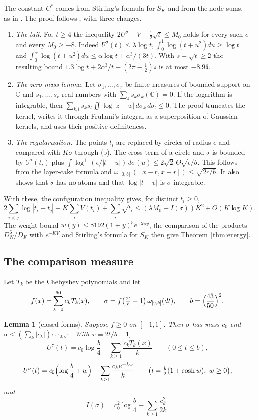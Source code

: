 \documentclass[11pt]{amsart}
\newtheorem{lemma}[theorem]{Lemma}
\theoremstyle{definition}
\theoremstyle{remark}
\numberwithin{equation}{section}
\newcommand{\C}{\mathbb C}
\begin{document}
The constant $C^*$ comes from Stirling's formula for $S_K$ and from the node sums, as in \cite[(6.3)]{Fauzan2026}. The
proof follows \cite[\S6]{Fauzan2026}, with three changes.
\begin{enumerate}[label=(\alph*),leftmargin=*]
\item \emph{The tail.} For $t\ge4$ the inequality $2U^\sigma-V+\frac12\sqrt t\le M_0$ holds for every such
 $\sigma$ and every $M_0\ge-8$. Indeed $U^\sigma(t)\le\lambda\log t$, $\int_0^1\log(t+u^2)du\ge\log t$ and
 $\int_0^\alpha\log(t+u^2)du\le\alpha\log t+\alpha^3/(3t)$. With $s=\sqrt t\ge2$ the resulting bound
 $1.3\log t+2\alpha^3/t-(2\pi-\frac12)s$ is at most $-8.96$.
\item \emph{The zero-mass lemma.} Let $\sigma_1,\dots,\sigma_r$ be finite measures of bounded support on $\C$ and
 $s_1,\dots,s_r$ real numbers with $\sum_ks_k\sigma_k(\C)=0$. If the logarithm is integrable, then
 $\sum_{k,l}s_ks_l\iint\log|z-w|\,d\sigma_k\,d\sigma_l\le0$. The proof truncates the kernel, writes it through
 Frullani's integral as a superposition of Gaussian kernels, and uses their positive definiteness.
\item \emph{The regularization.} The points $t_i$ are replaced by circles of radius $\epsilon$ and compared with
 $K\sigma$ through (b). The cross term of a circle and $\sigma$ is bounded by $U^\sigma(t_i)$ plus
 $\int\log^+(\epsilon/|t-u|)\,d\sigma(u)\le2\sqrt2\,\Theta\sqrt{\epsilon/b}$. This follows from the layer-cake formula
 and $\omega_{[0,b]}([x-r,x+r])\le\sqrt{2r/b}$. It also shows that $\sigma$ has no atoms and that $\log|t-u|$ is
 $\sigma$-integrable.
\end{enumerate}
With these, the configuration inequality gives, for distinct $t_i\ge0$,
\[
 2\sum_{i<j}\log|t_i-t_j|-K\sum_iV(t_i)+\sum_i\sqrt{t_i}\le(\lambda M_0-I(\sigma))K^2+O(K\log K).
\]
The weight bound $w(y)\le8192(1+y)^5e^{-2\pi y}$, the comparison of the products $D_N^6/D_K$ with $e^{-KV}$ and
Stirling's formula for $S_K$ then give Theorem~\ref{thm:energy}.

\subsection{The comparison measure}
Let $T_k$ be the Chebyshev polynomials and let
\[
 f(x)=\sum_{k=0}^{60}c_kT_k(x),\qquad \sigma=f\bigl(\tfrac{2t}b-1\bigr)\,\omega_{[0,b]}(dt),\qquad b=\Bigl(\frac{43}{50}\Bigr)^2.
\]

\begin{lemma}[closed forms]\label{lem:closed}
Suppose $f\ge0$ on $[-1,1]$. Then $\sigma$ has mass $c_0$ and $\sigma\le(\sum_k|c_k|)\,\omega_{[0,b]}$. With
$x=2t/b-1$,
\[
 U^\sigma(t)=c_0\log\frac b4-\sum_{k\ge1}\frac{c_kT_k(x)}k\qquad(0\le t\le b),
\]
\[
 U^\sigma(t)=c_0\Bigl(\log\frac b4+w\Bigr)-\sum_{k\ge1}\frac{c_ke^{-kw}}k\qquad\bigl(t=\tfrac b2(1+\cosh w),\ w\ge0\bigr),
\]
and
\[
 I(\sigma)=c_0^2\log\frac b4-\sum_{k\ge1}\frac{c_k^2}{2k}.
\]
\end{lemma}
\end{document}
